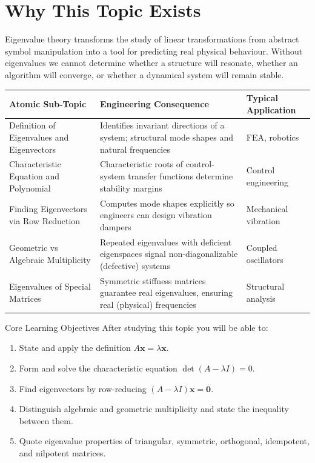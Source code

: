 \documentclass[12pt,a4paper]{article}
\begin{document}
\section{Why This Topic Exists}

Eigenvalue theory transforms the study of linear transformations from abstract symbol manipulation
into a tool for predicting real physical behaviour.
Without eigenvalues we cannot determine whether a structure will resonate, whether an algorithm will
converge, or whether a dynamical system will remain stable.

\begin{center}
\begin{tabular}{@{}p{5.5cm} p{5.5cm} p{4cm}@{}}
\toprule
\textbf{Atomic Sub-Topic} & \textbf{Engineering Consequence} & \textbf{Typical Application} \\
\midrule
Definition of Eigenvalues and Eigenvectors &
  Identifies invariant directions of a system; structural mode shapes and natural frequencies &
  FEA, robotics \\
\addlinespace
Characteristic Equation and Polynomial &
  Characteristic roots of control-system transfer functions determine stability margins &
  Control engineering \\
\addlinespace
Finding Eigenvectors via Row Reduction &
  Computes mode shapes explicitly so engineers can design vibration dampers &
  Mechanical vibration \\
\addlinespace
Geometric vs Algebraic Multiplicity &
  Repeated eigenvalues with deficient eigenspaces signal non-diagonalizable (defective) systems &
  Coupled oscillators \\
\addlinespace
Eigenvalues of Special Matrices &
  Symmetric stiffness matrices guarantee real eigenvalues, ensuring real (physical) frequencies &
  Structural analysis \\
\bottomrule
\end{tabular}
\end{center}

\begin{learnbox}{Core Learning Objectives}
After studying this topic you will be able to:
\begin{enumerate}
  \item State and apply the definition $A\mathbf{x} = \lambda\mathbf{x}$.
  \item Form and solve the characteristic equation $\det(A - \lambda I) = 0$.
  \item Find eigenvectors by row-reducing $(A - \lambda I)\mathbf{x} = \mathbf{0}$.
  \item Distinguish algebraic and geometric multiplicity and state the inequality between them.
  \item Quote eigenvalue properties of triangular, symmetric, orthogonal, idempotent, and nilpotent matrices.
\end{enumerate}
\end{learnbox}
\end{document}
